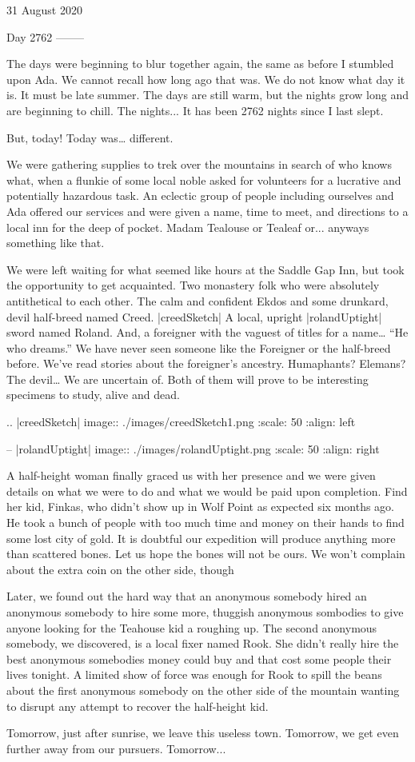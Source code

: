 31 August 2020

Day 2762
--------

The days were beginning to blur together again, the same as before I stumbled upon Ada.  We cannot recall how long ago that was.  We do not know what day it is.  It must be late summer.  The days are still warm, but the nights grow long and are beginning to chill.  The nights... It has been 2762 nights since I last slept.

But, today!  Today was… different.

We were gathering supplies to trek over the mountains in search of who knows what, when a flunkie of some local noble asked for volunteers for a lucrative and potentially hazardous task.  An eclectic group of people including ourselves and Ada offered our services and were given a name, time to meet, and directions to a local inn for the deep of pocket.  Madam Tealouse or Tealeaf or...  anyways something like that.

We were left waiting for what seemed like hours at the Saddle Gap Inn, but took the opportunity to get acquainted.  Two monastery folk who were absolutely antithetical to each other. The calm and confident Ekdos and some drunkard, devil half-breed named Creed. |creedSketch| A local, upright |rolandUptight| sword named Roland. And, a foreigner with the vaguest of titles for a name… “He who dreams.”  We have never seen someone like the Foreigner or the half-breed before.  We’ve read stories about the foreigner’s ancestry. Humaphants? Elemans?  The devil… We are uncertain of.  Both of them will prove to be interesting specimens to study, alive and dead.

.. |creedSketch| image:: ./images/creedSketch1.png
  :scale: 50%
  :align: left

-- |rolandUptight| image:: ./images/rolandUptight.png
  :scale: 50%
  :align: right

A half-height woman finally graced us with her presence and we were given details on what we were to do and what we would be paid upon completion.  Find her kid, Finkas, who didn’t show up in Wolf Point as expected six months ago.  He took a bunch of people with too much time and money on their hands to find some lost city of gold.  It is doubtful our expedition will produce anything more than scattered bones.  Let us hope the bones will not be ours.  We won’t complain about the extra coin on the other side, though

Later, we found out the hard way that an anonymous somebody hired an anonymous somebody to hire some more, thuggish anonymous sombodies to give anyone looking for the Teahouse kid a roughing up.  The second anonymous somebody, we discovered, is a local fixer named Rook.  She didn’t really hire the best anonymous somebodies money could buy and that cost some people their lives tonight.  A limited show of force was enough for Rook to spill the beans about the first anonymous somebody on the other side of the mountain wanting to disrupt any attempt to recover the half-height kid.

Tomorrow, just after sunrise, we leave this useless town.  Tomorrow, we get even further away from our pursuers.  Tomorrow... 
